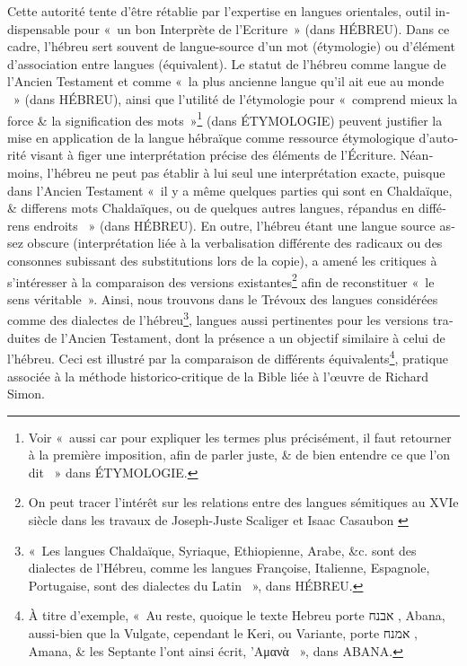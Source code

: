 \documentclass[output=paper,colorlinks,citecolor=brown,arabicfont,chinesefont,booklanguage=french]{langscibook}
\begin{document}
\begin{otherlanguage}{french}
Cette autorité tente d’être rétablie par l’expertise en langues orientales, outil indispensable pour «~un bon Interprète de l’Ecriture~» (dans HÉBREU). Dans ce cadre, l’hébreu sert souvent de langue-source d’un mot (étymologie) ou d’élément d’association entre langues (équivalent). Le statut de l’hébreu comme langue de l’Ancien Testament et comme «~la plus ancienne langue qu’il ait eue au monde ~» (dans HÉBREU), ainsi que l’utilité de l’étymologie pour «~comprend mieux la force \& la signification des mots~»\footnote{Voir «~aussi car pour expliquer les termes plus précisément, il faut retourner à la première imposition, afin de parler juste, \& de bien entendre ce que l’on dit  ~» dans ÉTYMOLOGIE.} (dans ÉTYMOLOGIE) peuvent justifier la mise en application de la langue hébraïque comme ressource étymologique d’autorité visant à figer une interprétation précise des éléments de l’Écriture. Néanmoins, l’hébreu ne peut pas établir à lui seul une interprétation exacte, puisque dans l’Ancien Testament «~il y a même quelques parties qui sont en Chaldaïque, \& differens mots Chaldaïques, ou de quelques autres langues, répandus en différens endroits ~» (dans HÉBREU). En outre, l'hébreu étant une langue source assez obscure (interprétation liée à la verbalisation différente des radicaux ou des consonnes subissant des substitutions lors de la copie), a amené les critiques à s’intéresser à la comparaison des versions existantes\footnote{On peut tracer l’intérêt sur les relations entre des langues sémitiques au XVIe siècle dans les travaux de Joseph-Juste Scaliger et Isaac Casaubon \citep{Laplanche1994}} afin de reconstituer «~le sens véritable~». Ainsi, nous trouvons dans le Trévoux des langues considérées comme des dialectes de l’hébreu\footnote{«~Les langues Chaldaïque, Syriaque, Ethiopienne, Arabe, \&c. sont des dialectes de l’Hébreu, comme les langues Françoise, Italienne, Espagnole, Portugaise, sont des dialectes du Latin ~», dans HÉBREU.}, langues aussi pertinentes pour les versions traduites de l’Ancien Testament, dont la présence a un objectif similaire à celui de l’hébreu. Ceci est illustré par la comparaison de différents équivalents\footnote{À titre d’exemple, «~Au reste, quoique le texte Hebreu porte אבנח , Abana, aussi-bien que la Vulgate, cependant le Keri, ou Variante, porte אמנח , Amana, \& les Septante l'ont ainsi écrit, 'Αμανὰ ~», dans ABANA.},  pratique associée à la méthode historico-critique de la Bible liée à l'œuvre de Richard Simon. 


\end{otherlanguage}
\end{document}
